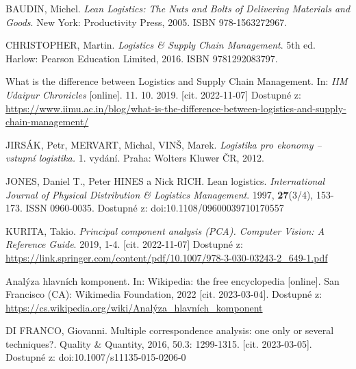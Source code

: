



\begin{thebibliography}{1}

BAUDIN, Michel. \textit{Lean Logistics: The Nuts and Bolts of Delivering Materials and Goods}. New York: Productivity Press, 2005. ISBN 978-1563272967.

CHRISTOPHER, Martin. \textit{Logistics \& Supply Chain Management}. 5th ed. Harlow: Pearson Education Limited, 2016. ISBN 9781292083797.

What is the difference between Logistics and Supply Chain Management. In: \textit{IIM Udaipur Chronicles} [online]. 11. 10. 2019. [cit. 2022-11-07] Dostupné z: \url{https://www.iimu.ac.in/blog/what-is-the-difference-between-logistics-and-supply-chain-management/}

JIRSÁK, Petr, MERVART, Michal, VINŠ, Marek. \textit{Logistika pro ekonomy -- vstupní logistika.} 1. vydání. Praha: Wolters Kluwer ČR, 2012.

JONES, Daniel T., Peter HINES a Nick RICH. Lean logistics. \textit{International Journal of Physical Distribution \& Logistics Management}. 1997, \textbf{27}(3/4), 153-173. ISSN 0960-0035. Dostupné z: doi:10.1108/09600039710170557

KURITA, Takio. \textit{Principal component analysis (PCA). Computer Vision: A Reference Guide}. 2019, 1-4. [cit. 2022-11-07] Dostupné z: \url{https://link.springer.com/content/pdf/10.1007/978-3-030-03243-2\_649-1.pdf}

Analýza hlavních komponent. In: Wikipedia: the free encyclopedia [online]. San Francisco (CA): Wikimedia Foundation, 2022 [cit. 2023-03-04]. Dostupné z: \url{https://cs.wikipedia.org/wiki/Analýza\_hlavních\_komponent}

DI FRANCO, Giovanni. Multiple correspondence analysis: one only or several techniques?. Quality \& Quantity, 2016, 50.3: 1299-1315. [cit. 2023-03-05]. Dostupné z: doi:10.1007/s11135-015-0206-0


\end{thebibliography}
